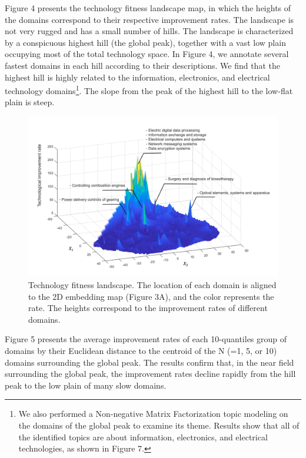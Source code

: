 \documentclass{article}
\begin{document}
Figure 4 presents the technology fitness landscape map, in which the heights of the domains correspond to their respective improvement rates. The landscape is not very rugged and has a small number of hills. The landscape is characterized by a conspicuous highest hill (the global peak), together with a vast low plain occupying most of the total technology space. In Figure 4, we annotate several fastest domains in each hill according to their descriptions. We find that the highest hill is highly related to the information, electronics, and electrical technology domains\footnote{We also performed a Non-negative Matrix Factorization topic modeling on the domains of the global peak to examine its theme. Results show that all of the identified topics are about information, electronics, and electrical technologies, as shown in Figure 7.}. The slope from the peak of the highest hill to the low-flat plain is steep.

\begin{figure}[H]
	\centering
	\includegraphics[width=15cm]{FIG4.png}
	\caption{Technology fitness landscape. The location of each domain is aligned to the 2D embedding map (Figure 3A), and the color represents the rate. The heights correspond to the improvement rates of different domains.}
	\label{fig:fig4}
\end{figure}

Figure 5 presents the average improvement rates of each 10-quantiles group of domains by their Euclidean distance to the centroid of the N (=1, 5, or 10) domains surrounding the global peak. The results confirm that, in the near field surrounding the global peak, the improvement rates decline rapidly from the hill peak to the low plain of many slow domains.
\end{document}
